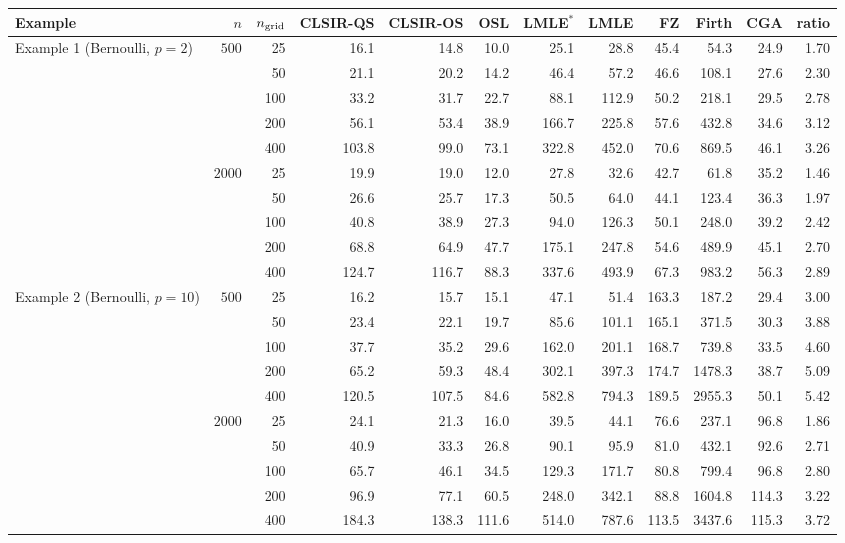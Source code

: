 \begin{tabular}{lrrrrrrrrrrr}
\toprule
Example & $n$ & $n_{\rm grid}$ & CLSIR-QS & CLSIR-OS & OSL & LMLE$^{\ast}$ & LMLE & FZ & Firth & CGA & ratio\\
\midrule
Example 1 (Bernoulli, $p=2$) & $500$ & 25 & 16.1 & 14.8 & 10.0 & 25.1 & 28.8 & 45.4 & 54.3 & 24.9 & 1.70\\
 &  & 50 & 21.1 & 20.2 & 14.2 & 46.4 & 57.2 & 46.6 & 108.1 & 27.6 & 2.30\\
 &  & 100 & 33.2 & 31.7 & 22.7 & 88.1 & 112.9 & 50.2 & 218.1 & 29.5 & 2.78\\
 &  & 200 & 56.1 & 53.4 & 38.9 & 166.7 & 225.8 & 57.6 & 432.8 & 34.6 & 3.12\\
 &  & 400 & 103.8 & 99.0 & 73.1 & 322.8 & 452.0 & 70.6 & 869.5 & 46.1 & 3.26\\
 & $2000$ & 25 & 19.9 & 19.0 & 12.0 & 27.8 & 32.6 & 42.7 & 61.8 & 35.2 & 1.46\\
 &  & 50 & 26.6 & 25.7 & 17.3 & 50.5 & 64.0 & 44.1 & 123.4 & 36.3 & 1.97\\
 &  & 100 & 40.8 & 38.9 & 27.3 & 94.0 & 126.3 & 50.1 & 248.0 & 39.2 & 2.42\\
 &  & 200 & 68.8 & 64.9 & 47.7 & 175.1 & 247.8 & 54.6 & 489.9 & 45.1 & 2.70\\
 &  & 400 & 124.7 & 116.7 & 88.3 & 337.6 & 493.9 & 67.3 & 983.2 & 56.3 & 2.89\\
\addlinespace
Example 2 (Bernoulli, $p=10$) & $500$ & 25 & 16.2 & 15.7 & 15.1 & 47.1 & 51.4 & 163.3 & 187.2 & 29.4 & 3.00\\
 &  & 50 & 23.4 & 22.1 & 19.7 & 85.6 & 101.1 & 165.1 & 371.5 & 30.3 & 3.88\\
 &  & 100 & 37.7 & 35.2 & 29.6 & 162.0 & 201.1 & 168.7 & 739.8 & 33.5 & 4.60\\
 &  & 200 & 65.2 & 59.3 & 48.4 & 302.1 & 397.3 & 174.7 & 1478.3 & 38.7 & 5.09\\
 &  & 400 & 120.5 & 107.5 & 84.6 & 582.8 & 794.3 & 189.5 & 2955.3 & 50.1 & 5.42\\
 & $2000$ & 25 & 24.1 & 21.3 & 16.0 & 39.5 & 44.1 & 76.6 & 237.1 & 96.8 & 1.86\\
 &  & 50 & 40.9 & 33.3 & 26.8 & 90.1 & 95.9 & 81.0 & 432.1 & 92.6 & 2.71\\
 &  & 100 & 65.7 & 46.1 & 34.5 & 129.3 & 171.7 & 80.8 & 799.4 & 96.8 & 2.80\\
 &  & 200 & 96.9 & 77.1 & 60.5 & 248.0 & 342.1 & 88.8 & 1604.8 & 114.3 & 3.22\\
 &  & 400 & 184.3 & 138.3 & 111.6 & 514.0 & 787.6 & 113.5 & 3437.6 & 115.3 & 3.72\\

\end{tabular}
